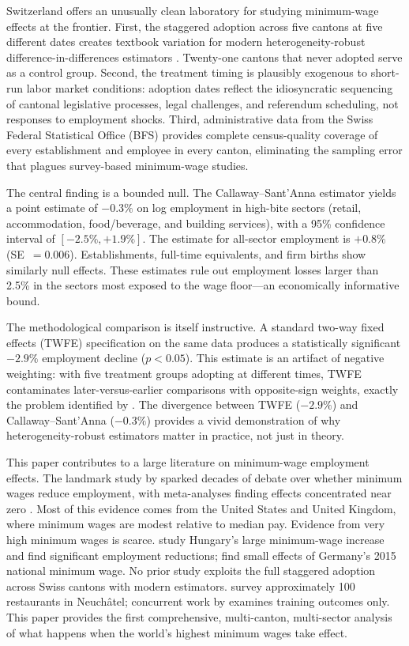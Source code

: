 \documentclass[12pt]{article}
\begin{document}
Switzerland offers an unusually clean laboratory for studying minimum-wage effects at the frontier. First, the staggered adoption across five cantons at five different dates creates textbook variation for modern heterogeneity-robust difference-in-differences estimators \citep{callaway2021}. Twenty-one cantons that never adopted serve as a control group. Second, the treatment timing is plausibly exogenous to short-run labor market conditions: adoption dates reflect the idiosyncratic sequencing of cantonal legislative processes, legal challenges, and referendum scheduling, not responses to employment shocks. Third, administrative data from the Swiss Federal Statistical Office (BFS) provides complete census-quality coverage of every establishment and employee in every canton, eliminating the sampling error that plagues survey-based minimum-wage studies.

The central finding is a bounded null. The Callaway--Sant'Anna estimator yields a point estimate of $-0.3\%$ on log employment in high-bite sectors (retail, accommodation, food/beverage, and building services), with a 95\% confidence interval of $[-2.5\%, +1.9\%]$. The estimate for all-sector employment is $+0.8\%$ (SE~$= 0.006$). Establishments, full-time equivalents, and firm births show similarly null effects. These estimates rule out employment losses larger than 2.5\% in the sectors most exposed to the wage floor---an economically informative bound.

The methodological comparison is itself instructive. A standard two-way fixed effects (TWFE) specification on the same data produces a statistically significant $-2.9\%$ employment decline ($p < 0.05$). This estimate is an artifact of negative weighting: with five treatment groups adopting at different times, TWFE contaminates later-versus-earlier comparisons with opposite-sign weights, exactly the problem identified by \citet{goodman2021}. The divergence between TWFE ($-2.9\%$) and Callaway--Sant'Anna ($-0.3\%$) provides a vivid demonstration of why heterogeneity-robust estimators matter in practice, not just in theory.

This paper contributes to a large literature on minimum-wage employment effects. The landmark study by \citet{card1994} sparked decades of debate over whether minimum wages reduce employment, with meta-analyses finding effects concentrated near zero \citep{dube2019,cengiz2019}. Most of this evidence comes from the United States and United Kingdom, where minimum wages are modest relative to median pay. Evidence from very high minimum wages is scarce. \citet{harasztosi2019} study Hungary's large minimum-wage increase and find significant employment reductions; \citet{dustmann2022} find small effects of Germany's 2015 national minimum wage. No prior study exploits the full staggered adoption across Swiss cantons with modern estimators. \citet{mohring2020} survey approximately 100 restaurants in Neuch\^atel; concurrent work by \citet{zigova2026} examines training outcomes only. This paper provides the first comprehensive, multi-canton, multi-sector analysis of what happens when the world's highest minimum wages take effect.
\end{document}
